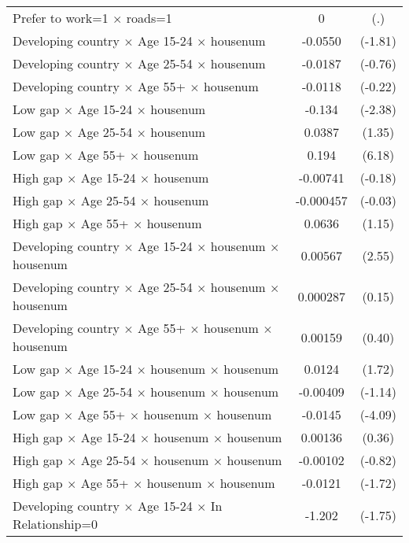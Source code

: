 {\begin{longtable}{l*{1}{cc}}
Prefer to work=1 $\times$ roads=1&           0         &         (.)\\
Developing country $\times$ Age 15-24 $\times$ housenum&     -0.0550         &     (-1.81)\\
Developing country $\times$ Age 25-54 $\times$ housenum&     -0.0187         &     (-0.76)\\
Developing country $\times$ Age 55+ $\times$ housenum&     -0.0118         &     (-0.22)\\
Low gap $\times$ Age 15-24 $\times$ housenum&      -0.134\sym{*}  &     (-2.38)\\
Low gap $\times$ Age 25-54 $\times$ housenum&      0.0387         &      (1.35)\\
Low gap $\times$ Age 55+ $\times$ housenum&       0.194\sym{***}&      (6.18)\\
High gap $\times$ Age 15-24 $\times$ housenum&    -0.00741         &     (-0.18)\\
High gap $\times$ Age 25-54 $\times$ housenum&   -0.000457         &     (-0.03)\\
High gap $\times$ Age 55+ $\times$ housenum&      0.0636         &      (1.15)\\
Developing country $\times$ Age 15-24 $\times$ housenum $\times$ housenum&     0.00567\sym{*}  &      (2.55)\\
Developing country $\times$ Age 25-54 $\times$ housenum $\times$ housenum&    0.000287         &      (0.15)\\
Developing country $\times$ Age 55+ $\times$ housenum $\times$ housenum&     0.00159         &      (0.40)\\
Low gap $\times$ Age 15-24 $\times$ housenum $\times$ housenum&      0.0124         &      (1.72)\\
Low gap $\times$ Age 25-54 $\times$ housenum $\times$ housenum&    -0.00409         &     (-1.14)\\
Low gap $\times$ Age 55+ $\times$ housenum $\times$ housenum&     -0.0145\sym{***}&     (-4.09)\\
High gap $\times$ Age 15-24 $\times$ housenum $\times$ housenum&     0.00136         &      (0.36)\\
High gap $\times$ Age 25-54 $\times$ housenum $\times$ housenum&    -0.00102         &     (-0.82)\\
High gap $\times$ Age 55+ $\times$ housenum $\times$ housenum&     -0.0121         &     (-1.72)\\
Developing country $\times$ Age 15-24 $\times$ In Relationship=0&      -1.202         &     (-1.75)\\

\end{longtable}}

